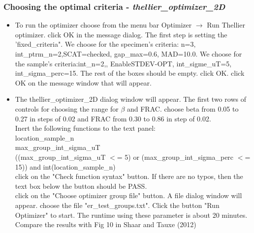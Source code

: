 \documentclass[12pt]{article}
\begin{document}
\subsubsection{Choosing the optimal criteria - \it{thellier\_optimizer\_2D}}
\begin{itemize}
\item To run the optimizer choose from the menu bar Optimizer $\rightarrow$ Run Thellier optimizer. click OK in the  message dialog. The first step is setting the 'fixed\_criteria". We choose for the specimen's criteria: n=3, int\_ptrm\_n=2,SCAT=checked, gap\_max=0.6, MAD=10.0. We choose for the sample's criteria:int\_n=2,, EnableSTDEV-OPT, int\_sigme\_uT=5, int\_sigma\_perc=15. The rest of the boxes should be empty. click OK. click OK on the message window that will appear.
\item The thellier\_optimizer\_2D dialog window will appear. The first two rows of controls for choosing the range for $\beta$ and FRAC. choose beta from 0.05 to 0.27 in steps of 0.02 and FRAC from 0.30 to 0.86 in step of 0.02. \\
Inert the following functions to the text panel:\\
location\_sample\_n\\
max\_group\_int\_sigma\_uT\\
((max\_group\_int\_sigma\_uT $<$= 5) or (max\_group\_int\_sigma\_perc $<$= 15)) and  int(location\_sample\_n) \\
click on the "Check function syntax" button. If there are no typos, then the text box below the button should be PASS.\\
click on the "Choose optimizer group file" button. A file dialog window will appear. choose the file "er\_test\_groups.txt". Click the button "Run Optimizer" to start. The runtime using these parameter is about 20 minutes. Compare the results with Fig 10 in Shaar and Tauxe (2012)


\end{itemize}
\end{document}

